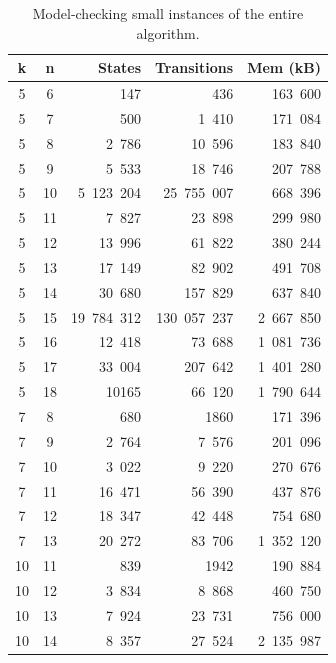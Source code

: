 \begin{table}[htbp] 
\centering
{  
\begin{tabular}{|c|c|r|r|r|}
\hline 
\textbf{k} & \textbf{n} & \textbf{States} & \textbf{Transitions} & 
\textbf{Mem (kB)}  \\ \hline 
5 & 6 & 147 & 436 & 163\, 600 \\ \hline 
5 & 7 & 500 & 1\, 410 & 171\, 084  \\ \hline 
5 & 8 & 2\, 786 & 10\, 596 & 183\, 840  \\ \hline 
5 & 9 & 5\, 533 & 18\, 746 & 207\, 788  \\ \hline 
5 & 10 & 5\, 123\, 204 & 25\, 755\, 007 & 668\, 396 \\ \hline 
5 & 11 & 7\, 827 & 23\, 898 & 299\, 980  \\ \hline 
5 & 12 & 13\, 996 & 61\, 822 & 380\, 244  \\ \hline 
5 & 13 & 17\, 149 & 82\, 902 & 491\, 708  \\ \hline 
5 & 14 & 30\, 680 & 157\, 829 & 637\, 840 \\ \hline 
5 & 15 & 19\, 784\, 312 & 130\, 057\, 237 & 2\, 667\, 850 \\ \hline 
5 & 16 & 12\, 418 & 73\, 688 & 1\, 081\, 736  \\ \hline 
5 & 17 & 33\, 004 & 207\, 642 & 1\, 401\, 280  \\ \hline 
5 & 18 & 10165 & 66\, 120 & 1\, 790\, 644  \\ \hline 
\hline 
7 & 8 & 680 & 1860 & 171\, 396 \\ \hline 
7 & 9 & 2\, 764 & 7\, 576 & 201\, 096 \\ \hline 
7 & 10 & 3\, 022 & 9\, 220 & 270\, 676 \\ \hline 
7 & 11 & 16\, 471 & 56\, 390 & 437\, 876 \\ \hline 
7 & 12 & 18\, 347 & 42\, 448 & 754\, 680 \\ \hline 
7 & 13 & 20\, 272 & 83\, 706 & 1\, 352\, 120 \\ \hline
\hline 
10 & 11 & 839 & 1942 & 190\, 884  \\ \hline 
10 & 12 & 3\, 834 & 8\, 868 & 460\, 750  \\ \hline 
10 & 13 & 7\, 924 & 23\, 731 & 756\, 000  \\ \hline 
10 & 14 & 8\, 357 & 27\, 524 & 2\, 135\, 987  \\ \hline 
\end{tabular}}
\caption{Model-checking small instances of the entire algorithm.} 
\label{tab: flo+}
\end{table}

